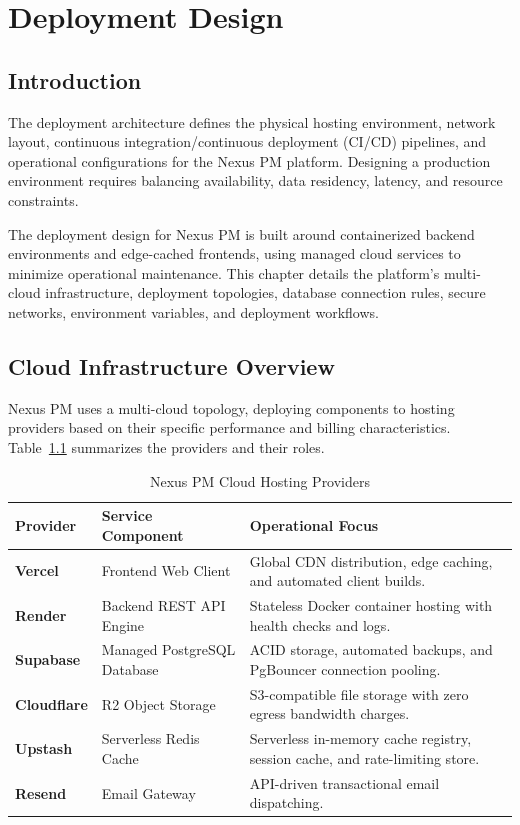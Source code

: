 \chapter{Deployment Design}
\label{chap:deployment-design}

\section{Introduction}
The deployment architecture defines the physical hosting environment, network layout, continuous integration/continuous deployment (CI/CD) pipelines, and operational configurations for the Nexus PM platform. Designing a production environment requires balancing availability, data residency, latency, and resource constraints.

The deployment design for Nexus PM is built around containerized backend environments and edge-cached frontends, using managed cloud services to minimize operational maintenance. This chapter details the platform's multi-cloud infrastructure, deployment topologies, database connection rules, secure networks, environment variables, and deployment workflows.

\section{Cloud Infrastructure Overview}
Nexus PM uses a multi-cloud topology, deploying components to hosting providers based on their specific performance and billing characteristics. Table~\ref{tab:cloud_providers} summarizes the providers and their roles.

\begin{table}[h!]
\centering
\small
\renewcommand{\arraystretch}{1.4}
\begin{tabularx}{\textwidth}{l l X}
    \toprule[1.5pt]
    \rowcolor{primary!5}
    \textbf{\color{primary}Provider} & \textbf{\color{primary}Service Component} & \textbf{\color{primary}Operational Focus} \\
    \midrule
    \textbf{Vercel} & Frontend Web Client & Global CDN distribution, edge caching, and automated client builds. \\
    \textbf{Render} & Backend REST API Engine & Stateless Docker container hosting with health checks and logs. \\
    \textbf{Supabase} & Managed PostgreSQL Database & ACID storage, automated backups, and PgBouncer connection pooling. \\
    \textbf{Cloudflare} & R2 Object Storage & S3-compatible file storage with zero egress bandwidth charges. \\
    \textbf{Upstash} & Serverless Redis Cache & Serverless in-memory cache registry, session cache, and rate-limiting store. \\
    \textbf{Resend} & Email Gateway & API-driven transactional email dispatching. \\
    \bottomrule[1.5pt]
\end{tabularx}
\caption{Nexus PM Cloud Hosting Providers}
\label{tab:cloud_providers}
\end{table}

